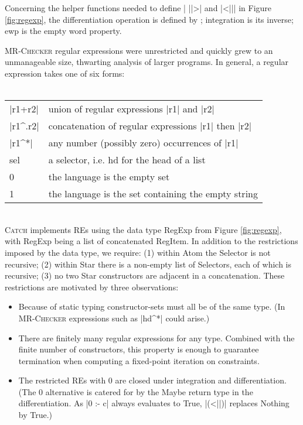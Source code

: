 \documentclass[preprint]{sigplanconf}
\newcommand{\C}[1]{\textsf{#1}}
\newcommand{\catch}{\textsc{Catch}}
\newcommand{\newtool}{\anon{\catch07}{\catch}}
\newcommand{\oldtool}{\anon{\catch05}{\textsc{MR-Checker}}}
\newcommand{\anon}[2]{#2}
\begin{document}
Concerning the helper functions needed to define | ||>| and |<||| in Figure \ref{fig:regexp}, the differentiation operation is defined by \citet{conway:regexp}; integration is its inverse; \C{ewp} is the empty word property.

\oldtool{} regular expressions were unrestricted and quickly grew to an unmanageable size, thwarting analysis of larger programs. In general, a regular expression takes one of six forms:\\ \\
\begin{tabular}{ll}
|r1+r2|  & union of regular expressions |r1| and |r2| \\
|r1^.r2| & concatenation of regular expressions |r1| then |r2| \\
|r1^*|   & any number (possibly zero) occurrences of |r1| \\
\C{sel}  & a selector, i.e. \C{hd} for the head of a list \\
0        & the language is the empty set \\
1        & the language is the set containing the empty string
\end{tabular} \\

\newtool{} implements REs using the data type \C{RegExp} from Figure \ref{fig:regexp}, with \C{RegExp} being a list of concatenated \C{RegItem}. In addition to the restrictions imposed by the data type, we require: (1) within \C{Atom} the \C{Selector} is not recursive; (2) within \C{Star} there is a non-empty list of \C{Selector}s, each of which is recursive; (3) no two \C{Star} constructors are adjacent in a concatenation. These restrictions are motivated by three observations:

\begin{itemize}
\item Because of static typing constructor-sets must all be of the same type. (In \oldtool{} expressions such as |hd^*| could arise.)

\item There are finitely many regular expressions for any type. Combined with the finite number of constructors, this property is enough to guarantee termination when computing a fixed-point iteration on constraints.

\item The restricted REs with 0 are closed under integration and differentiation. (The 0 alternative is catered for by the \C{Maybe} return type in the differentiation. As |0 :- c| always evaluates to True, |(<||)| replaces \C{Nothing} by True.)
\end{itemize}
\end{document}
